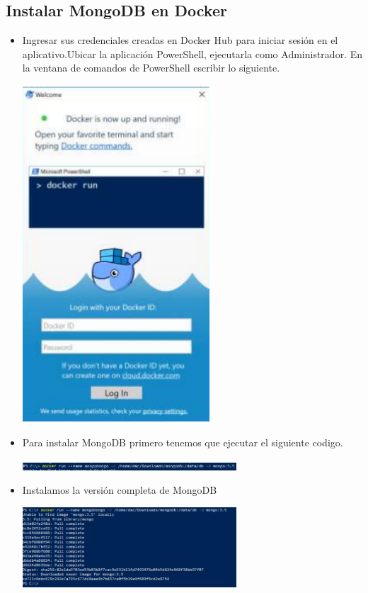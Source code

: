 \documentclass[%
 reprint,
 amsmath,amssymb,
 aps,
]{revtex4-1}
\begin{document}
\subsection{Instalar MongoDB en Docker}
                     \begin{itemize}
                     \item Ingresar sus credenciales creadas en Docker Hub para iniciar sesión en el aplicativo.Ubicar la aplicación PowerShell, ejecutarla como Administrador. En la ventana de comandos de PowerShell escribir lo siguiente.
                     \begin{center}
		\includegraphics[width=7cm]{./Imagenes/8}
		\end{center}	
		\item Para instalar MongoDB primero tenemos que ejecutar el siguiente codigo.
                     \begin{center}
		\includegraphics[width=8cm]{./Imagenes/6}
		\end{center}	
		\item Instalamos la versión completa de MongoDB
                      \begin{center}
		\includegraphics[width=8cm]{./Imagenes/7}

\end{center}
\end{itemize}
\end{document}

